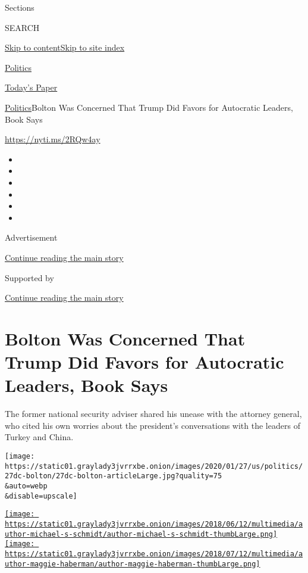 Sections

SEARCH

\protect\hyperlink{site-content}{Skip to
content}\protect\hyperlink{site-index}{Skip to site index}

\href{https://www.nytimes3xbfgragh.onion/section/politics}{Politics}

\href{https://myaccount.nytimes3xbfgragh.onion/auth/login?response_type=cookie\&client_id=vi}{}

\href{https://www.nytimes3xbfgragh.onion/section/todayspaper}{Today's
Paper}

\href{/section/politics}{Politics}\textbar{}Bolton Was Concerned That
Trump Did Favors for Autocratic Leaders, Book Says

\url{https://nyti.ms/2RQw4ay}

\begin{itemize}
\item
\item
\item
\item
\item
\item
\end{itemize}

Advertisement

\protect\hyperlink{after-top}{Continue reading the main story}

Supported by

\protect\hyperlink{after-sponsor}{Continue reading the main story}

\hypertarget{bolton-was-concerned-that-trump-did-favors-for-autocratic-leaders-book-says}{%
\section{Bolton Was Concerned That Trump Did Favors for Autocratic
Leaders, Book
Says}\label{bolton-was-concerned-that-trump-did-favors-for-autocratic-leaders-book-says}}

The former national security adviser shared his unease with the attorney
general, who cited his own worries about the president's conversations
with the leaders of Turkey and China.

\texttt{[image: https://static01.graylady3jvrrxbe.onion/images/2020/01/27/us/politics/27dc-bolton/27dc-bolton-articleLarge.jpg?quality=75\\\&auto=webp\\\&disable=upscale]}

\href{https://www.nytimes3xbfgragh.onion/by/michael-s-schmidt}{\texttt{[image: https://static01.graylady3jvrrxbe.onion/images/2018/06/12/multimedia/author-michael-s-schmidt/author-michael-s-schmidt-thumbLarge.png]}}\href{https://www.nytimes3xbfgragh.onion/by/maggie-haberman}{\texttt{[image: https://static01.graylady3jvrrxbe.onion/images/2018/07/12/multimedia/author-maggie-haberman/author-maggie-haberman-thumbLarge.png]}}

